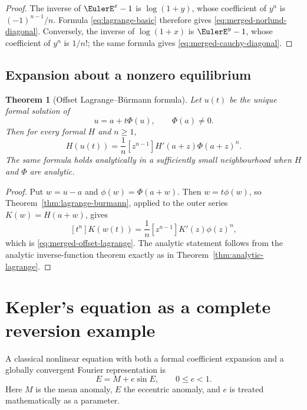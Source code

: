 \documentclass[11pt,a4paper,oneside,openany]{book}
\newtheorem{theorem}{Theorem}[chapter]
\theoremstyle{definition}
\theoremstyle{remark}
\begin{document}
\begin{proof}
The inverse of $\EulerE^x-1$ is $\log(1+y)$, whose coefficient of $y^n$ is
$(-1)^{n-1}/n$.  Formula \eqref{eq:lagrange-basic} therefore gives
\eqref{eq:merged-norlund-diagonal}.  Conversely, the inverse of
$\log(1+x)$ is $\EulerE^y-1$, whose coefficient of $y^n$ is $1/n!$; the same
formula gives \eqref{eq:merged-cauchy-diagonal}.
\end{proof}

\section{Expansion about a nonzero equilibrium}

\begin{theorem}[Offset Lagrange--B\"urmann formula]
\label{thm:merged-offset-lagrange}
Let $u(t)$ be the unique formal solution of
\begin{equation}
 u=a+t\Phi(u),\qquad \Phi(a)\ne0.                                  \label{eq:merged-offset-equation}
\end{equation}
Then for every formal $H$ and $n\geq1$,
\begin{equation}
 [t^n]H(u(t))
 =\frac1n[z^{n-1}]H'(a+z)\Phi(a+z)^n.                              \label{eq:merged-offset-lagrange}
\end{equation}
The same formula holds analytically in a sufficiently small neighbourhood
when $H$ and $\Phi$ are analytic.
\end{theorem}

\begin{proof}
Put $w=u-a$ and $\phi(w)=\Phi(a+w)$.  Then $w=t\phi(w)$, so
Theorem~\ref{thm:lagrange-burmann}, applied to the outer series
$K(w)=H(a+w)$, gives
\[
 [t^n]K(w(t))=\frac1n[z^{n-1}]K'(z)\phi(z)^n,
\]
which is \eqref{eq:merged-offset-lagrange}.  The analytic statement follows
from the analytic inverse-function theorem exactly as in
Theorem~\ref{thm:analytic-lagrange}.
\end{proof}

\chapter{Kepler's equation as a complete reversion example}
\label{ch:merged-kepler}

A classical nonlinear equation with both a formal coefficient expansion and
a globally convergent Fourier representation is
\begin{equation}
 E=M+e\sin E,\qquad 0\leq e<1.                                    \label{eq:merged-kepler}
\end{equation}
Here $M$ is the mean anomaly, $E$ the eccentric anomaly, and $e$ is treated
mathematically as a parameter.
\end{document}
